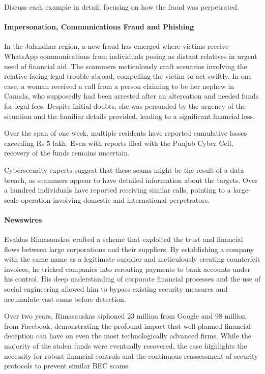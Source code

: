 \documentclass[11pt]{article}
\begin{document}
Discuss each example in detail, focusing on how the fraud was perpetrated.
\paragraph*{Impersonation, Communications Fraud and Phishing}
In the Jalandhar region, a new fraud has emerged where victims receive WhatsApp communications from individuals posing as distant relatives in urgent need of financial aid. The scammers meticulously craft scenarios involving the relative facing legal trouble abroad, compelling the victim to act swiftly. In one case, a woman received a call from a person claiming to be her nephew in Canada, who supposedly had been arrested after an altercation and needed funds for legal fees. Despite initial doubts, she was persuaded by the urgency of the situation and the familiar details provided, leading to a significant financial loss.

Over the span of one week, multiple residents have reported cumulative losses exceeding Rs 5 lakh. Even with reports filed with the Punjab Cyber Cell, recovery of the funds remains uncertain.

Cybersecurity experts suggest that these scams might be the result of a data breach, as scammers appear to have detailed information about the targets. Over a hundred individuals have reported receiving similar calls, pointing to a large-scale operation involving domestic and international perpetrators.
\paragraph*{Newswires}
Evaldas Rimasauskas crafted a scheme that exploited the trust and financial flows between large corporations and their suppliers. By establishing a company with the same name as a legitimate supplier and meticulously creating counterfeit invoices, he tricked companies into rerouting payments to bank accounts under his control. His deep understanding of corporate financial processes and the use of social engineering allowed him to bypass existing security measures and accumulate vast sums before detection.

Over two years, Rimasauskas siphoned 23 million from Google and 98 million from Facebook, demonstrating the profound impact that well-planned financial deception can have on even the most technologically advanced firms. While the majority of the stolen funds were eventually recovered, the case highlights the necessity for robust financial controls and the continuous reassessment of security protocols to prevent similar BEC scams.
\end{document}
